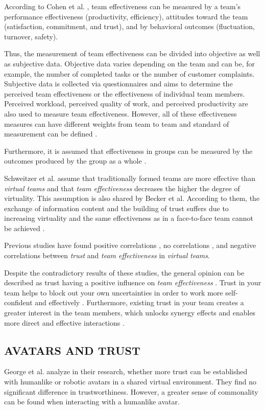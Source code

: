 \documentclass[sigchi]{acmart}
\begin{document}
According to Cohen et al. \citep{cohen1997makes}, team effectiveness can be measured by a team's performance effectiveness (productivity, efficiency), attitudes toward the team (satisfaction, commitment, and trust), and by behavioral outcomes (fluctuation, turnover, safety). 

Thus, the measurement of team effectiveness can be divided into objective as well as subjective data. Objective data varies depending on the team and can be, for example, the number of completed tasks or the number of customer complaints. Subjective data is collected via questionnaires and aims to determine the perceived team effectiveness or the effectiveness of individual team members. Perceived workload, perceived quality of work, and perceived productivity are also used to measure team effectiveness. However, all of these effectiveness measures can have different weights from team to team and standard of measurement can be defined \citep{pina2008teams}. 

Furthermore, it is assumed that effectiveness in groups can be measured by the outcomes produced by the group as a whole \citep{guzzo1996teams}. 

Schweitzer et al. \citep{schweitzer2010conceptualizing} assume that traditionally formed teams are more effective than \textit{virtual teams} and that \textit{team effectiveness} decreases the higher the degree of virtuality.
This assumption is also shared by Becker et al. According to them, the exchange of information content and the building of trust suffers due to increasing virtuality and the same effectiveness as in a face-to-face team cannot be achieved \citep{handke2019alles}.

Previous studies have found positive correlations \citep{davis2000trusted}, no correlations \citep{hertel2004managing}, and negative correlations \citep{dirks1999effects} between \textit{trust} and \textit{team effectiveness} in \textit{virtual teams}.

Despite the contradictory results of these studies, the general opinion can be described as trust having a positive influence on \textit{team effectiveness} \citep{de2016trust}. 
Trust in your team helps to block out your own uncertainties in order to work more self-confident and effectively \citep{en2010does}. Furthermore, existing trust in your team creates a greater interest in the team members, which unlocks synergy effects and enables more direct and effective interactions \citep{dirks1999effects}. 

\subsection{AVATARS AND TRUST}
George et al. \citep{george2018trusting} analyze in their research, whether more trust can be established with humanlike or robotic avatars in a shared virtual environment. They find no significant difference in trustworthiness. However, a greater sense of commonality can be found when interacting with a humanlike avatar.
\end{document}
